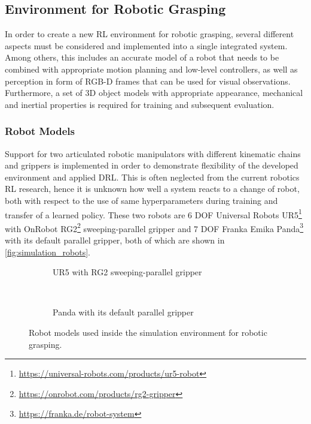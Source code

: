 \subsection{Environment for Robotic Grasping}

In order to create a new RL environment for robotic grasping, several different aspects must be considered and implemented into a single integrated system. Among others, this includes an accurate model of a robot that needs to be combined with appropriate motion planning and low-level controllers, as well as perception in form of RGB-D frames that can be used for visual observations. Furthermore, a set of 3D object models with appropriate appearance, mechanical and inertial properties is required for training and subsequent evaluation.


\subsubsection{Robot Models}

Support for two articulated robotic manipulators with different kinematic chains and grippers is implemented in order to demonstrate flexibility of the developed environment and applied DRL. This is often neglected from the current robotics RL research, hence it is unknown how well a system reacts to a change of robot, both with respect to the use of same hyperparameters during training and transfer of a learned policy. These two robots are 6 DOF Universal Robots UR5\footnote{\href{https://universal-robots.com/products/ur5-robot}{https://universal-robots.com/products/ur5-robot}} with OnRobot RG2\footnote{\href{https://onrobot.com/products/rg2-gripper}{https://onrobot.com/products/rg2-gripper}} sweeping-parallel gripper and 7 DOF Franka Emika Panda\footnote{\href{https://franka.de/robot-system}{https://franka.de/robot-system}} with its default parallel gripper, both of which are shown in \autoref{fig:simulation_robots}.

\begin{figure}[ht]
    \centering
    \begin{subfigure}[ht]{0.4975\textwidth}
        \centering
        \caption*{UR5 with RG2 sweeping-parallel gripper}
    \end{subfigure}%
    ~%
    \begin{subfigure}[ht]{0.4975\textwidth}
        \centering
        \caption*{Panda with its default parallel gripper}
    \end{subfigure}%
    \caption{Robot models used inside the simulation environment for robotic grasping.}
    \label{fig:simulation_robots}
\end{figure}

